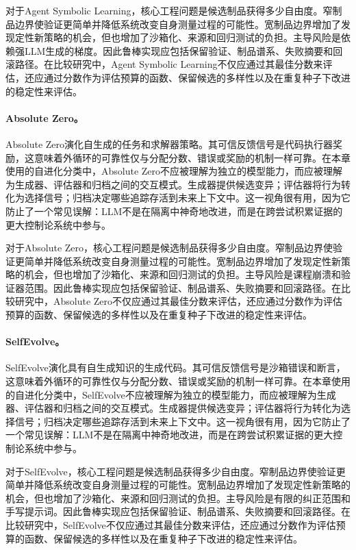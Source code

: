 对于Agent Symbolic Learning，核心工程问题是候选制品获得多少自由度。窄制品边界使验证更简单并降低系统改变自身测量过程的可能性。宽制品边界增加了发现定性新策略的机会，但也增加了沙箱化、来源和回归测试的负担。主导风险是依赖强LLM生成的梯度。因此鲁棒实现应包括保留验证、制品谱系、失败摘要和回滚路径。在比较研究中，Agent Symbolic Learning不仅应通过其最佳分数来评估，还应通过分数作为评估预算的函数、保留候选的多样性以及在重复种子下改进的稳定性来评估。

\paragraph{Absolute Zero。} Absolute Zero演化自生成的任务和求解器策略。其可信反馈信号是代码执行器奖励，这意味着外循环的可靠性仅与分配分数、错误或奖励的机制一样可靠。在本章使用的自进化分类中，Absolute Zero不应被理解为独立的模型能力，而应被理解为生成器、评估器和归档之间的交互模式。生成器提供候选变异；评估器将行为转化为选择信号；归档决定哪些追踪存活到未来上下文中。这一视角很有用，因为它防止了一个常见误解：LLM不是在隔离中神奇地改进，而是在跨尝试积累证据的更大控制论系统中参与。

对于Absolute Zero，核心工程问题是候选制品获得多少自由度。窄制品边界使验证更简单并降低系统改变自身测量过程的可能性。宽制品边界增加了发现定性新策略的机会，但也增加了沙箱化、来源和回归测试的负担。主导风险是课程崩溃和验证器范围。因此鲁棒实现应包括保留验证、制品谱系、失败摘要和回滚路径。在比较研究中，Absolute Zero不仅应通过其最佳分数来评估，还应通过分数作为评估预算的函数、保留候选的多样性以及在重复种子下改进的稳定性来评估。

\paragraph{SelfEvolve。} SelfEvolve演化具有自生成知识的生成代码。其可信反馈信号是沙箱错误和断言，这意味着外循环的可靠性仅与分配分数、错误或奖励的机制一样可靠。在本章使用的自进化分类中，SelfEvolve不应被理解为独立的模型能力，而应被理解为生成器、评估器和归档之间的交互模式。生成器提供候选变异；评估器将行为转化为选择信号；归档决定哪些追踪存活到未来上下文中。这一视角很有用，因为它防止了一个常见误解：LLM不是在隔离中神奇地改进，而是在跨尝试积累证据的更大控制论系统中参与。

对于SelfEvolve，核心工程问题是候选制品获得多少自由度。窄制品边界使验证更简单并降低系统改变自身测量过程的可能性。宽制品边界增加了发现定性新策略的机会，但也增加了沙箱化、来源和回归测试的负担。主导风险是有限的纠正范围和手写提示词。因此鲁棒实现应包括保留验证、制品谱系、失败摘要和回滚路径。在比较研究中，SelfEvolve不仅应通过其最佳分数来评估，还应通过分数作为评估预算的函数、保留候选的多样性以及在重复种子下改进的稳定性来评估。


